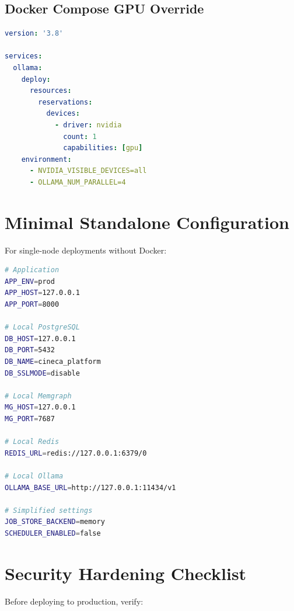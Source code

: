 \subsection{Docker Compose GPU Override}

\begin{lstlisting}[language=yaml,caption={docker-compose.gpu.yml}]
version: '3.8'

services:
  ollama:
    deploy:
      resources:
        reservations:
          devices:
            - driver: nvidia
              count: 1
              capabilities: [gpu]
    environment:
      - NVIDIA_VISIBLE_DEVICES=all
      - OLLAMA_NUM_PARALLEL=4
\end{lstlisting}

\section{Minimal Standalone Configuration}
\label{app:config:standalone}

For single-node deployments without Docker:

\begin{lstlisting}[language=bash,caption={.env.standalone}]
# Application
APP_ENV=prod
APP_HOST=127.0.0.1
APP_PORT=8000

# Local PostgreSQL
DB_HOST=127.0.0.1
DB_PORT=5432
DB_NAME=cineca_platform
DB_SSLMODE=disable

# Local Memgraph
MG_HOST=127.0.0.1
MG_PORT=7687

# Local Redis
REDIS_URL=redis://127.0.0.1:6379/0

# Local Ollama
OLLAMA_BASE_URL=http://127.0.0.1:11434/v1

# Simplified settings
JOB_STORE_BACKEND=memory
SCHEDULER_ENABLED=false
\end{lstlisting}

\section{Security Hardening Checklist}
\label{app:config:security-checklist}

Before deploying to production, verify:

